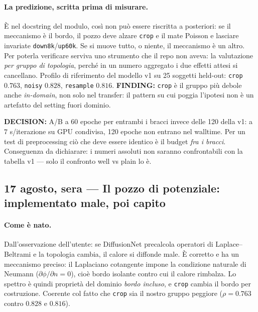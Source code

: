 \documentclass[11pt,a4paper]{article}
\newcommand{\finding}[1]{\textcolor{finding}{\textbf{FINDING:}} #1}
\newcommand{\decision}[1]{\textcolor{decision}{\textbf{DECISION:}} #1}
\begin{document}
\paragraph{La predizione, scritta prima di misurare.}
\`E nel docstring del modulo, cos\`i non pu\`o essere riscritta a posteriori: se il meccanismo
\`e il bordo, il pozzo deve alzare \texttt{crop} e il mate Poisson e lasciare invariate
\texttt{down8k}/\texttt{up60k}. Se si muove tutto, o niente, il meccanismo \`e un altro.
Per poterla verificare serviva uno strumento che il repo non aveva: la valutazione
\emph{per gruppo di topologia}, perch\'e in un numero aggregato i due effetti attesi si
cancellano. Profilo di riferimento del modello v1 su 25 soggetti held-out:
\texttt{crop} $0.763$, \texttt{noisy} $0.828$, \texttt{resample} $0.816$.
\finding{\texttt{crop} \`e il gruppo pi\`u debole anche \emph{in-domain}, non solo nel transfer:
il pattern su cui poggia l'ipotesi non \`e un artefatto del setting fuori dominio.}

\decision{A/B a 60 epoche per entrambi i bracci invece delle 120 della v1: a $7$ s/iterazione
su GPU condivisa, 120 epoche non entrano nel walltime. Per un test di preprocessing ci\`o che
deve essere identico \`e il budget \emph{fra i bracci}. Conseguenza da dichiarare: i numeri
assoluti non saranno confrontabili con la tabella v1 --- solo il confronto well vs plain lo \`e.}


\subsection{17 agosto, sera --- Il pozzo di potenziale: implementato male, poi capito}

\paragraph{Come è nato.} Dall'osservazione dell'utente: se DiffusionNet precalcola operatori
di Laplace--Beltrami e la topologia cambia, il calore si diffonde male. È corretto e ha un
meccanismo preciso: il Laplaciano cotangente impone la condizione naturale di Neumann
($\partial\phi/\partial n = 0$), cioè bordo isolante contro cui il calore rimbalza. Lo spettro
è quindi proprietà del dominio \emph{bordo incluso}, e \texttt{crop} cambia il bordo per
costruzione. Coerente col fatto che \texttt{crop} sia il nostro gruppo peggiore
($\rho = 0.763$ contro $0.828$ e $0.816$).
\end{document}
